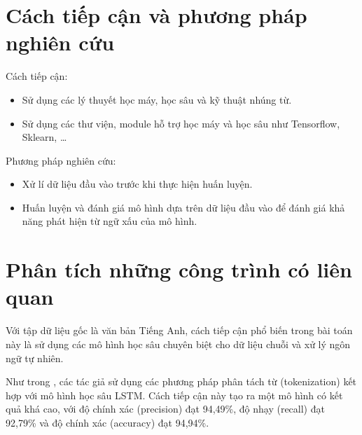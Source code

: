 \section{Cách tiếp cận và phương pháp nghiên cứu}
Cách tiếp cận:
\begin{itemize}
    \item Sử dụng các lý thuyết học máy, học sâu và kỹ thuật nhúng từ.
    \item Sử dụng các thư viện, module hỗ trợ học máy và học sâu như Tensorflow, Sklearn, \dots
\end{itemize}

Phương pháp nghiên cứu:
\begin{itemize}
    \item Xử lí dữ liệu đầu vào trước khi thực hiện huấn luyện.
    \item Huấn luyện và đánh giá mô hình dựa trên dữ liệu đầu vào để đánh giá khả năng phát hiện từ ngữ xấu của mô hình.
\end{itemize}

\section{Phân tích những công trình có liên quan}


Với tập dữ liệu gốc là văn bản Tiếng Anh, cách tiếp cận phổ biến trong bài toán này là sử dụng các mô hình học sâu chuyên biệt cho dữ liệu chuỗi và xử lý ngôn ngữ tự nhiên.

Như trong \cite{9339521}, các tác giả sử dụng các phương pháp phân tách từ (tokenization) kết hợp với mô hình học sâu LSTM. Cách tiếp cận này tạo ra một mô hình có kết quả khá cao, với độ chính xác (precision) đạt 94,49\%, độ nhạy (recall) đạt 92,79\% và độ chính xác (accuracy) đạt 94,94\%.

